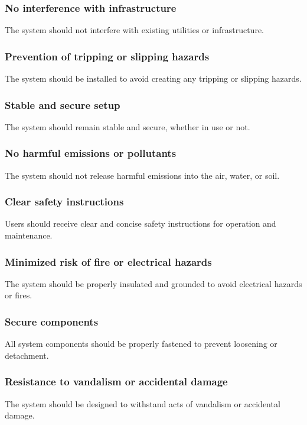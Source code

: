 \documentclass[11pt]{article}
\begin{document}
\subsubsection{No interference with infrastructure}
The system should not interfere with existing utilities or infrastructure.

\subsubsection{Prevention of tripping or slipping hazards}
The system should be installed to avoid creating any tripping or slipping hazards.

\subsubsection{Stable and secure setup}
The system should remain stable and secure, whether in use or not.

\subsubsection{No harmful emissions or pollutants}
The system should not release harmful emissions into the air, water, or soil.

\subsubsection{Clear safety instructions}
Users should receive clear and concise safety instructions for operation and maintenance.

\subsubsection{Minimized risk of fire or electrical hazards}
The system should be properly insulated and grounded to avoid electrical hazards or fires.

\subsubsection{Secure components}
All system components should be properly fastened to prevent loosening or detachment.

\subsubsection{Resistance to vandalism or accidental damage}
The system should be designed to withstand acts of vandalism or accidental damage.
\end{document}

